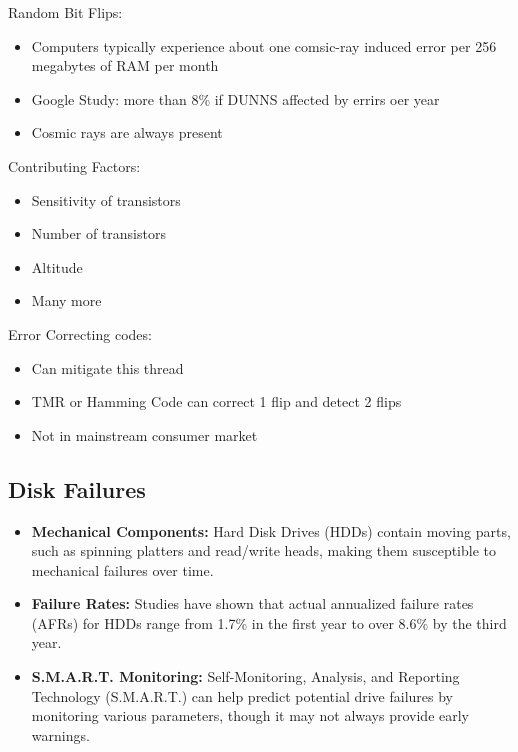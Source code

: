 \documentclass[../Main.tex]{subfiles}
\begin{document}
Random Bit Flips:
\begin{itemize}
    \item Computers typically experience about one comsic-ray induced error per 256 megabytes of RAM per month
    \item Google Study: more than 8\% if DUNNS affected by errirs oer year
    \item Cosmic rays are always present
\end{itemize}

Contributing Factors:
\begin{itemize}
    \item Sensitivity of transistors
    \item Number of transistors
    \item Altitude
    \item Many more
\end{itemize}

Error Correcting codes:
\begin{itemize}
    \item Can mitigate this thread
    \item TMR or Hamming Code can correct 1 flip and detect 2 flips
    \item Not in mainstream consumer market
\end{itemize}

\subsection{Disk Failures}

\begin{itemize}
    \item \textbf{Mechanical Components:} Hard Disk Drives (HDDs) contain moving parts, such as spinning platters and read/write heads, making them susceptible to mechanical failures over time.
    \item \textbf{Failure Rates:} Studies have shown that actual annualized failure rates (AFRs) for
    HDDs range from 1.7\% in the first year to over 8.6\% by the third year. \cite{turn0search24}
    \item \textbf{S.M.A.R.T. Monitoring:} Self-Monitoring, Analysis, and Reporting Technology (S.M.A.R.T.)
    can help predict potential drive failures by monitoring various parameters, though it may not always provide early warnings. \cite{turn0search24}
\end{itemize}
\end{document}
